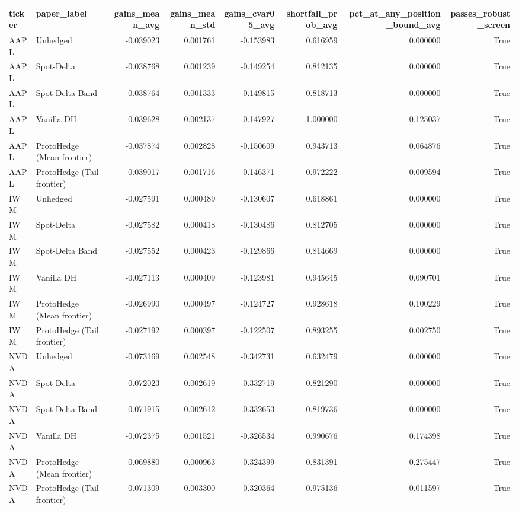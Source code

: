 \begin{tabular}{llrrrrrr}
\toprule
ticker & paper_label & gains_mean_avg & gains_mean_std & gains_cvar05_avg & shortfall_prob_avg & pct_at_any_position_bound_avg & passes_robust_screen \\
\midrule
AAPL & Unhedged & -0.039023 & 0.001761 & -0.153983 & 0.616959 & 0.000000 & True \\
AAPL & Spot-Delta & -0.038768 & 0.001239 & -0.149254 & 0.812135 & 0.000000 & True \\
AAPL & Spot-Delta Band & -0.038764 & 0.001333 & -0.149815 & 0.818713 & 0.000000 & True \\
AAPL & Vanilla DH & -0.039628 & 0.002137 & -0.147927 & 1.000000 & 0.125037 & True \\
AAPL & ProtoHedge (Mean frontier) & -0.037874 & 0.002828 & -0.150609 & 0.943713 & 0.064876 & True \\
AAPL & ProtoHedge (Tail frontier) & -0.039017 & 0.001716 & -0.146371 & 0.972222 & 0.009594 & True \\
IWM & Unhedged & -0.027591 & 0.000489 & -0.130607 & 0.618861 & 0.000000 & True \\
IWM & Spot-Delta & -0.027582 & 0.000418 & -0.130486 & 0.812705 & 0.000000 & True \\
IWM & Spot-Delta Band & -0.027552 & 0.000423 & -0.129866 & 0.814669 & 0.000000 & True \\
IWM & Vanilla DH & -0.027113 & 0.000409 & -0.123981 & 0.945645 & 0.090701 & True \\
IWM & ProtoHedge (Mean frontier) & -0.026990 & 0.000497 & -0.124727 & 0.928618 & 0.100229 & True \\
IWM & ProtoHedge (Tail frontier) & -0.027192 & 0.000397 & -0.122507 & 0.893255 & 0.002750 & True \\
NVDA & Unhedged & -0.073169 & 0.002548 & -0.342731 & 0.632479 & 0.000000 & True \\
NVDA & Spot-Delta & -0.072023 & 0.002619 & -0.332719 & 0.821290 & 0.000000 & True \\
NVDA & Spot-Delta Band & -0.071915 & 0.002612 & -0.332653 & 0.819736 & 0.000000 & True \\
NVDA & Vanilla DH & -0.072375 & 0.001521 & -0.326534 & 0.990676 & 0.174398 & True \\
NVDA & ProtoHedge (Mean frontier) & -0.069880 & 0.000963 & -0.324399 & 0.831391 & 0.275447 & True \\
NVDA & ProtoHedge (Tail frontier) & -0.071309 & 0.003300 & -0.320364 & 0.975136 & 0.011597 & True \\

\end{tabular}
